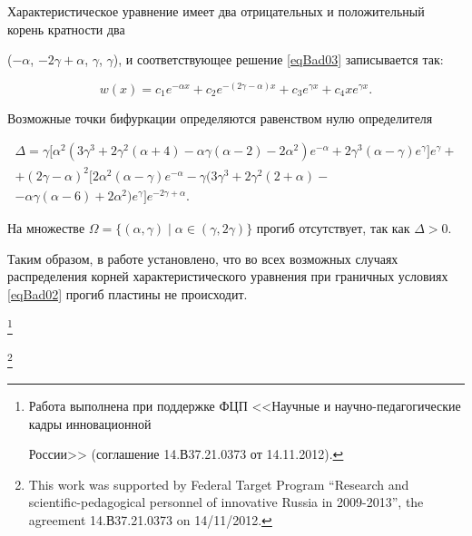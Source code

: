Характеристическое уравнение имеет два отрицательных и положительный корень кратности два 

($-\alpha $, $-2\gamma+\alpha$, $\gamma$, $\gamma$), и соответствующее решение \eqref{eqBad03} записывается так: 

$$

w(x)=c_1 e^{-\alpha x}+c_2 e^{-(2\gamma-\alpha) x}+c_3 e^{\gamma x}+c_4  x e^{\gamma x}.

$$ 

Возможные точки бифуркации определяются равенством нулю определителя

\begin{multline*}

\Delta=\gamma\big[ \alpha^2(3\gamma^3+2\gamma^2(\alpha+4)-\alpha\gamma(\alpha-2)-2\alpha^2)e^{-\alpha}+2\gamma^3(\alpha-\gamma)e^{\gamma} \big]e^{\gamma}+\\+(2\gamma-\alpha)^2\big[ 2\alpha^2(\alpha-\gamma)e^{-\alpha}-\gamma(3\gamma^3+2\gamma^2(2+\alpha)- \\

- \alpha\gamma(\alpha-6)+2\alpha^2)e^{\gamma} \big]e^{-2\gamma+\alpha}.

\end{multline*}

На множестве $\Omega=\{(\alpha,\gamma) \mid \alpha\in(\gamma, 2\gamma)\}$ прогиб отсутствует, так как $\Delta>0$.







Таким образом, в работе установлено, что во всех возможных случаях распределения корней характеристического уравнения при граничных условиях \eqref{eqBad02} прогиб пластины не происходит.



\thanks{Работа выполнена при поддержке ФЦП <<Научные и научно-педагогические кадры инновационной

России>>  (соглашение 14.В37.21.0373 от 14.11.2012).}



\thanks{This work was supported by Federal Target Program ``Research and scientific-pedagogical personnel of innovative Russia in 2009-2013'', the agreement 14.В37.21.0373 on 14/11/2012.}






